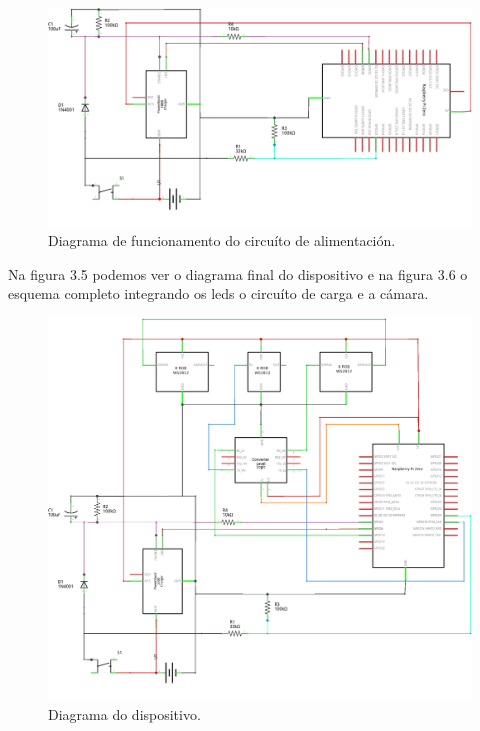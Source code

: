 \begin{itemize}
    \begin{figure}[tb]
      \centering
    	\includegraphics[scale=1]{imaxes/circuito-bateria.png}
    	\caption{Diagrama de funcionamento do circuíto de alimentación.}
    	\label{f:circuíto de alimentación}
    \end{figure}

    Na figura 3.5 podemos ver o diagrama final do dispositivo e na figura 3.6 o esquema completo integrando os leds o circuíto de carga e a cámara.

    \begin{figure}[tb]
      \centering
    	\includegraphics[scale=1]{imaxes/circuito-completo.png}
    	\caption{Diagrama do dispositivo.}
    	\label{f:circuíto do dispositivo}
    \end{figure}


\end{itemize}
